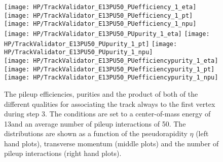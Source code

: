 \begin{figure}[!h]
  \centering
  \texttt{[image: HP/TrackValidator\_E13PU50\_PUefficiency\_1\_eta]}
  \texttt{[image: HP/TrackValidator\_E13PU50\_PUefficiency\_1\_pt]}
  \texttt{[image: HP/TrackValidator\_E13PU50\_PUefficiency\_1\_npu]}
   \\
  \texttt{[image: HP/TrackValidator\_E13PU50\_PUpurity\_1\_eta]}
  \texttt{[image: HP/TrackValidator\_E13PU50\_PUpurity\_1\_pt]}
  \texttt{[image: HP/TrackValidator\_E13PU50\_PUpurity\_1\_npu]}
   \\
  \texttt{[image: HP/TrackValidator\_E13PU50\_PUefficiencypurity\_1\_eta]}
  \texttt{[image: HP/TrackValidator\_E13PU50\_PUefficiencypurity\_1\_pt]}
  \texttt{[image: HP/TrackValidator\_E13PU50\_PUefficiencypurity\_1\_npu]}
  \caption[Pileup efficiencies, purities and their product of the different qualities of the association map with associating the track always to the first vertex during step 3 with 13\TeV and $\left<PU\right>=50$]{The pileup efficiencies, purities and the product of both of the different qualities for associating the track always to the first vertex during step 3. The conditions are set to a center-of-mass energy of 13\TeV and an average number of pileup interactions of 50. The distributions are shown as a function of the pseudorapidity $\eta$ (left hand plots), transverse momentum (middle plots) and the number of pileup interactions (right hand plots).}
\end{figure}
\clearpage

